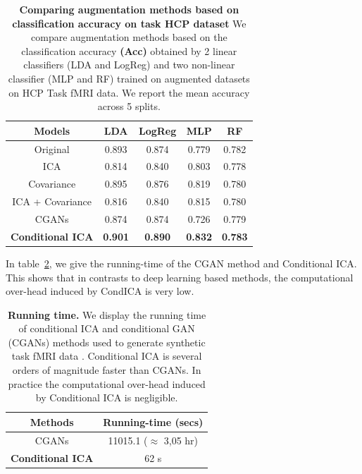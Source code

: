 \begin{table}
  \setlength{\tabcolsep}{0.23em}
  \begin{center}
    \begin{tabular}{c|c|c|c | c}
      \hline
      Models & LDA & LogReg & MLP& RF\\
      \hline
      Original           & 0.893 & 0.874 &  0.779 &0.782 \\
    ICA                & 0.814 & 0.840 &  0.803 &0.778\\
    Covariance         & 0.895 & 0.876 &  0.819 &0.780\\
    ICA + Covariance   & 0.816 & 0.840 &  0.815 &0.780\\
    CGANs              & 0.874 & 0.874 &   0.726&0.779 \\
    \hline                                      
      \textbf{Conditional ICA} &  \textbf{0.901} & \textbf{0.890} & \textbf{0.832} &  \textbf{0.783} \\
    \hline\hline
\end{tabular}
\end{center}
\caption{\textbf{Comparing augmentation methods based on classification accuracy on task
      HCP dataset} We compare augmentation methods based on the classification
    accuracy \textbf{(Acc)} obtained by 2 linear classifiers (LDA and LogReg) and two
    non-linear classifier (MLP and RF) trained on augmented datasets on HCP
    Task fMRI data. We report the mean accuracy across 5 splits.}
  \label{condica:tab3}
\end{table}

In table~\ref{app:runningtime:tab}, we give the running-time of the CGAN
method and Conditional ICA. This shows that in contrasts to deep learning based
methods, the computational over-head induced by CondICA is very low.
\begin{table}
  \begin{center}
    \begin{tabular}{|c|c|}
      \hline
      Methods & Running-time (secs)
      \\ \hline
      CGANs  & 11015.1 ($\approx$ 3,05 hr)
      \\
      \textbf{Conditional ICA}  & 62 s 
      \\
      \hline
    \end{tabular}
  \end{center}
  \caption{\textbf{Running time.} We display the running time of conditional ICA
    and conditional GAN (CGANs) methods used
    to generate synthetic task fMRI data . Conditional ICA is several orders of magnitude faster than
    CGANs. In practice the computational over-head induced by Conditional ICA is negligible.}\label{app:runningtime:tab}
\end{table}

